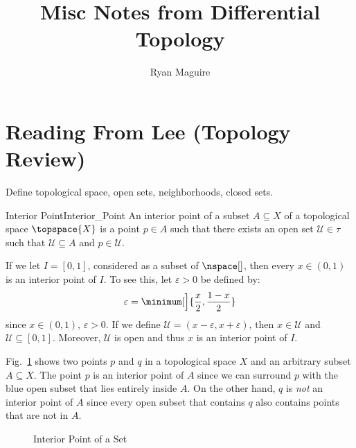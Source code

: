 \documentclass{article}                                                        %
\begin{document}
    \title{Misc Notes from Differential Topology}
    \author{Ryan Maguire}
    \date{\vspace{-5ex}}
    \maketitle
    \tableofcontents
    \listoffigures
    \newpage
    \section{Reading From Lee (Topology Review)}
        Define topological space, open sets, neighborhoods, closed sets.
        \begin{fdefinition}{Interior Point}{Interior_Point}
            An interior point of a subset $A\subseteq{X}$ of a topological space
            $\topspace{X}$ is a point $p\in{A}$ such that there exists an open
            set $\mathcal{U}\in\tau$ such that $\mathcal{U}\subseteq{A}$ and
            $p\in\mathcal{U}$.
        \end{fdefinition}
        \begin{example}
            If we let $I=[0,1]$, considered as a subset of $\nspace[]$, then
            every $x\in(0,1)$ is an interior point of $I$. To see this, let
            $\varepsilon>0$ be defined by:
            \begin{equation}
                \varepsilon=\minimum[\Big]{\frac{x}{2},\frac{1-x}{2}}
            \end{equation}
            since $x\in(0,1)$, $\varepsilon>0$. If we define
            $\mathcal{U}=(x-\varepsilon,x+\varepsilon)$, then
            $x\in\mathcal{U}$ and $\mathcal{U}\subseteq[0,1]$. Moreover,
            $\mathcal{U}$ is open and thus $x$ is an interior point of $I$.
        \end{example}
        Fig.~\ref{fig:Interior_Point_of_Set} shows two points $p$ and $q$ in a
        topological space $X$ and an arbitrary subset $A\subseteq{X}$. The point
        $p$ is an interior point of $A$ since we can surround $p$ with the blue
        open subset that lies entirely inside $A$. On the other hand, $q$ is
        \textit{not} an interior point of $A$ since every open subset that
        contains $q$ also contains points that are not in $A$.
        \begin{figure}[H]
            \centering
            \captionsetup{type=figure}
            
            \caption{Interior Point of a Set}
            \label{fig:Interior_Point_of_Set}
        \end{figure}
\end{document}
